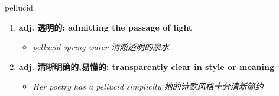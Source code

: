 
\begin{frame}
{\huge pellucid}
\begin{center}
\begin{enumerate}\Large
  \item \textbf{adj. 透明的: admitting the passage of light}
  \begin{itemize}
    \item \em{\Large{pellucid spring water 清澈透明的泉水}}
  \end{itemize}
  \item \textbf{adj. 清晰明确的,易懂的: transparently clear in style or meaning}
  \begin{itemize}
    \item \em{\Large{Her poetry has a pellucid simplicity 她的诗歌风格十分清新简约}}
  \end{itemize}
\end{enumerate}
\end{center}
\end{frame}
